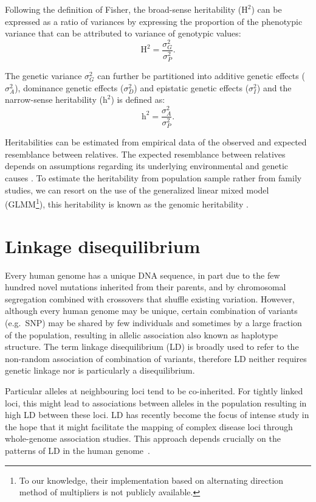 \documentclass[]{book}
\let\rmarkdownfootnote\footnote%
\def\footnote{\protect\rmarkdownfootnote}
\begin{document}
Following the definition of Fisher, the broad-sense heritability
(\(\text{H}^2\)) can be expressed as a ratio of variances by expressing
the proportion of the phenotypic variance that can be attributed to
variance of genotypic values:
\[\text{H}^2 = \frac{\sigma^2_G}{\sigma^2_P}.\]

The genetic variance \(\sigma^2_G\) can further be partitioned into
additive genetic effects (\(\sigma^2_A\)), dominance genetic effects
(\(\sigma^2_D\)) and epistatic genetic effects (\(\sigma^2_I\)) and the
narrow-sense heritability (\(\text{h}^2\)) is defined as:
\[\text{h}^2 = \frac{\sigma^2_A}{\sigma^2_P}.\]

Heritabilities can be estimated from empirical data of the observed and
expected resemblance between relatives. The expected resemblance between
relatives depends on assumptions regarding its underlying environmental
and genetic causes \citep{visscher_heritability_2008}. To estimate the
heritability from population sample rather from family studies, we can
resort on the use of the generalized linear mixed model (GLMM\footnote{To our knowledge, their implementation based on alternating
  direction method of multipliers is not publicly available.}), this
heritability is known as the genomic heritability \citep{dandine2015use}.

\hypertarget{LD}{%
\section{Linkage disequilibrium}\label{LD}}

Every human genome has a unique DNA sequence, in part due to the few
hundred novel mutations inherited from their parents, and by chromosomal
segregation combined with crossovers that shuffle existing variation.
However, although every human genome may be unique, certain combination
of variants (e.g.~SNP) may be shared by few individuals and sometimes by
a large fraction of the population, resulting in allelic association
also known as haplotype structure. The term linkage disequilibrium (LD)
is broadly used to refer to the non-random association of combination of
variants, therefore LD neither requires genetic linkage nor is
particularly a disequilibrium.

Particular alleles at neighbouring loci tend to be co-inherited. For
tightly linked loci, this might lead to associations between alleles in
the population resulting in high LD between these loci. LD has recently
become the focus of intense study in the hope that it might facilitate
the mapping of complex disease loci through whole-genome association
studies. This approach depends crucially on the patterns of LD in the
human genome~\citep{ardlie_patterns_2002}.
\end{document}
